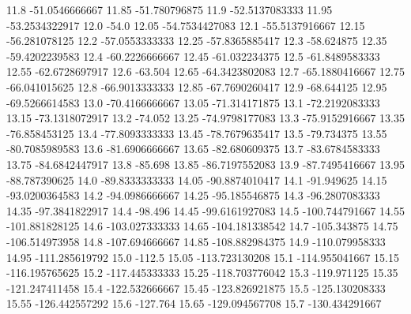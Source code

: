            11.8   -51.0546666667
          11.85    -51.780796875
           11.9   -52.5137083333
          11.95   -53.2534322917
           12.0            -54.0
          12.05   -54.7534427083
           12.1   -55.5137916667
          12.15    -56.281078125
           12.2   -57.0553333333
          12.25   -57.8365885417
           12.3       -58.624875
          12.35   -59.4202239583
           12.4   -60.2226666667
          12.45    -61.032234375
           12.5   -61.8489583333
          12.55   -62.6728697917
           12.6          -63.504
          12.65   -64.3423802083
           12.7   -65.1880416667
          12.75    -66.041015625
           12.8   -66.9013333333
          12.85   -67.7690260417
           12.9       -68.644125
          12.95   -69.5266614583
           13.0   -70.4166666667
          13.05    -71.314171875
           13.1   -72.2192083333
          13.15   -73.1318072917
           13.2          -74.052
          13.25   -74.9798177083
           13.3   -75.9152916667
          13.35    -76.858453125
           13.4   -77.8093333333
          13.45   -78.7679635417
           13.5       -79.734375
          13.55   -80.7085989583
           13.6   -81.6906666667
          13.65    -82.680609375
           13.7   -83.6784583333
          13.75   -84.6842447917
           13.8          -85.698
          13.85   -86.7197552083
           13.9   -87.7495416667
          13.95    -88.787390625
           14.0   -89.8333333333
          14.05   -90.8874010417
           14.1       -91.949625
          14.15   -93.0200364583
           14.2   -94.0986666667
          14.25    -95.185546875
           14.3   -96.2807083333
          14.35   -97.3841822917
           14.4          -98.496
          14.45   -99.6161927083
           14.5   -100.744791667
          14.55   -101.881828125
           14.6   -103.027333333
          14.65   -104.181338542
           14.7      -105.343875
          14.75   -106.514973958
           14.8   -107.694666667
          14.85   -108.882984375
           14.9   -110.079958333
          14.95   -111.285619792
           15.0           -112.5
          15.05   -113.723130208
           15.1   -114.955041667
          15.15   -116.195765625
           15.2   -117.445333333
          15.25   -118.703776042
           15.3      -119.971125
          15.35   -121.247411458
           15.4   -122.532666667
          15.45   -123.826921875
           15.5   -125.130208333
          15.55   -126.442557292
           15.6         -127.764
          15.65   -129.094567708
           15.7   -130.434291667
